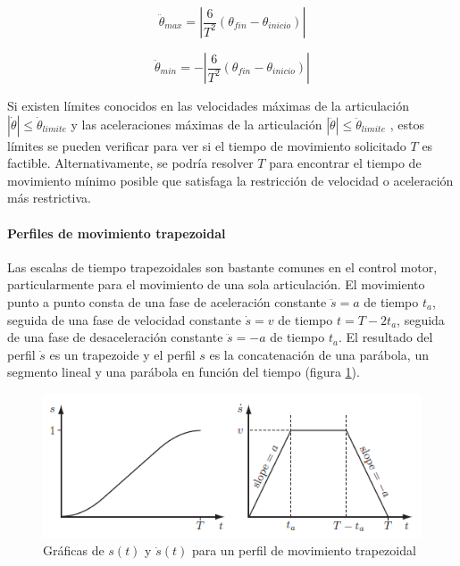             \begin{equation}
                  {\ddot{\theta}}_{max}= \left | { \frac{6}{T^2} (\theta_{fin}-\theta_{inicio})} \right|
                \label{eq:cap4_tray_26}
             \end{equation} 
        
            \begin{equation}
                  {\ddot{\theta}}_{min}= -\left | { \frac{6}{T^2} (\theta_{fin}-\theta_{inicio})} \right|
                \label{eq:cap4_tray_27}
             \end{equation} 
             
        Si existen límites conocidos en las velocidades máximas de la articulación $\left|\dot{\theta} \right|  \leq  {\dot{\theta}}_{limite} $  y las aceleraciones máximas de la articulación  $\left|\ddot{\theta} \right|  \leq  {\ddot{\theta}}_{limite} $ , estos límites se pueden verificar para ver si el tiempo de movimiento solicitado $T$ es factible. Alternativamente, se podría resolver $T$ para encontrar el tiempo de movimiento mínimo posible que satisfaga la restricción de velocidad o aceleración más restrictiva.
        
        \newpage

             
        \paragraph{Perfiles de movimiento trapezoidal}\label{Perfiles_de_movimiento_trapezoidal}
        
        Las escalas de tiempo trapezoidales son bastante comunes en el control motor, particularmente para el movimiento de una sola articulación. El movimiento punto a punto consta de una fase de aceleración constante $\ddot{s}=a$ de tiempo $t_a$, seguida de una fase de velocidad constante $\dot{s}=v$ de tiempo $t = T-2t_a$, seguida de una fase de desaceleración constante $\ddot{s}=-a$ de tiempo $t_a$. El resultado del perfil $\dot{s}$ es un trapezoide y el perfil $s$ es la concatenación de una parábola, un segmento lineal y una parábola en función del tiempo (figura \ref{f:Cap4_tray_9}).

            \begin{figure}[htb]
                \centering
                \includegraphics[width=0.7\linewidth]{Main/Chapter4/Images4/cap4_tray_9.png}
                \caption{Gráficas de $s(t)$ y $\dot{s}(t)$ para un perfil de movimiento trapezoidal \cite{moder_robot}}
                \label{f:Cap4_tray_9}
            \end{figure}  
    
